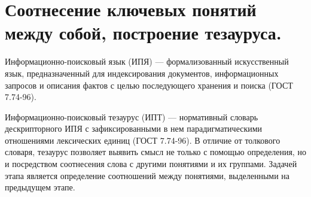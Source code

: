 
\pagebreak


\section{Соотнесение ключевых понятий между собой, построение тезауруса.}

Информационно-поисковый язык (ИПЯ) — формализованный искусственный язык, предназначенный для
индексирования документов, информационных запросов и описания фактов с целью последующего хранения
и поиска (ГОСТ 7.74-96).


Информационно-поисковый тезаурус (ИПТ) — нормативный словарь дескрипторного ИПЯ с зафиксированными
в нем парадигматическими отношениями лексических единиц (ГОСТ 7.74-96).
В отличие от толкового словаря, тезаурус позволяет выявить смысл не только с помощью определения,
но и посредством соотнесения слова с другими понятиями и их группами.
Задачей этапа является определение соотношений между понятиями, выделенными на предыдущем этапе.

\begin{figure}[ht]
    \begin{center}
    \end {center}\label{fig:thesaurus_img}
\end {figure}
